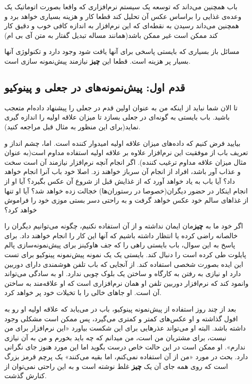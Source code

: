 باب همچنین می‌داند که توسعه یک سیستم نرم‌افزاری که واقعا بصورت اتوماتیک
یک وعده‌ی غذایی را براساس عکس آن تحلیل کند قطعا کار و هزینه بسیاری خواهد
برد و همچنین می‌داند رسیدن به نقطه‌ای که این نرم‌افزار به اندازه کافی
خوب و دقیق کار کند ممکن است غیر ممکن باشد(همانند مساله تبدیل گفتار به
متن آی بی ام)

مسائل باز بسیاری که بایستی پاسخی برای آنها یافت شود وجود دارد و تکنولوژی
آنها بسیار پر هزینه است. قطعا این \textbf{چیز} نیازمند پیش‌نمونه سازی
است.

\subsection{قدم اول: پیش‌نمونه‌های در جعلی و
پینوکیو}\label{ux642ux62fux645-ux627ux648ux644-ux67eux6ccux634ux646ux645ux648ux646ux647ux647ux627ux6cc-ux62fux631-ux62cux639ux644ux6cc-ux648-ux67eux6ccux646ux648ux6a9ux6ccux648}

تا الان شما نباید از اینکه من به عنوان اولین قدم در جعلی را پیشنهاد
داده‌ام متعجب باشید. باب بایستی به گونه‌ای در جعلی بسازد تا میزان علاقه
اولیه را اندازه گیری نماید(برای این منظور به مثال قبل مراجعه کنید).

بیایید فرض کنیم که داده‌های میزان علاقه اولیه امیدوار کننده است. اما،
چشم انداز و تعریف باب از موفقیت این نرم‌افزار علاوه بر علاقه اولیه
استفاده مداوم است(به عنوان مثال میزان علاقه مداوم ترغیب کننده). اگر
انجام آنچه نرم‌افزار نیازمند آن است سخت و عذاب آور باشد، افراد از انجام
آن سرباز خواهند زد. اصلا خود باب آنرا انجام خواهد داد؟ آیا باب به یاد
خواهد آورد که از غذایش قبل از شروع آن عکس بگیرد؟ آیا او از انجام اینکار
در حضور دیگران(خصوصا در رستوران‌ها) خجالت زده خواهد شد؟ آیا او تنها از
غذاهای سالم خود عکس خواهد گرفت و به راحتی دسر بستی موزی خود را فراموش
خواهد کرد؟

اگر خود ما به \textbf{چیز}مان ایمان نداشته و از آن استفاده نکنیم، چگونه
می‌توانیم دیگران را خالصانه راضی کرده یا انتظار داشته باشیم که آنها این
کار را انجام خواهند داد. برای پاسخ به این سوال، باب بایستی راهی را که جف
هاوکینز برای پیش‌نمونه‌سازی پالم پایلوت طی کرده است را دنبال کند. بایستی
یک یک نمونه پیش‌نمونه پینوکیو برای تست این ایده بصورت شخصی استفاده کند.
از آنجایی که باب تلفن هوشمندی دارای دوربین دارد او نیازی به رفتن به
کارگاه و ساختن یک بلوک چوبی ندارد. او به سادگی می‌تواند وانمود کند که
نرم‌افزار دوربین تلفن او همان نرم‌افزاری است که او علاقه‌مند به ساختن آن
است. او جاهای خالی را با تخیلات خود پر خواهد کرد.

بعد از چند روز استفاده از پیش‌نمونه پینوکیو، باب در می‌یابد که علاقه
اولیه او رو به افول گذاشته و او عکس‌های کمتر و کمتری می‌گیرد، پس ممکن
است مشکلی وجود داشته باشد. البته او می‌تواند عذرهایی برای این شکست
بیاورد «این نرم‌افزار برای من نیست، برای مشتریان من است، من میدانم که چه
باید بخورم و من به آن نیازی ندارم». او ممکن است در این حالت خاص درست
بگوید اما این مورد هنوز جای نگرانی دارد. بحث در مورد «من از آن استفاده
نمی‌کنم، اما بقیه می‌کنند» یک پرچم قرمز بزرگ است که روی همه جای آن یک
\textbf{چیز} غلط نوشته است و به این راحتی نمی‌توان از کنارش گذشت.

